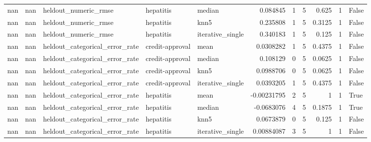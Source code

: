 \begin{table}[ht]
\begin{tabular}{rrlllrrrrrl}
        nan &     nan & heldout\_numeric\_rmse           & hepatitis       & median           &      0.084845    &                   1 &       5 &    0.625  &        1 & False              \\
        nan &     nan & heldout\_numeric\_rmse           & hepatitis       & knn5             &      0.235808    &                   1 &       5 &    0.3125 &        1 & False              \\
        nan &     nan & heldout\_numeric\_rmse           & hepatitis       & iterative\_single &      0.340183    &                   1 &       5 &    0.125  &        1 & False              \\
        nan &     nan & heldout\_categorical\_error\_rate & credit-approval & mean             &      0.0308282   &                   1 &       5 &    0.4375 &        1 & False              \\
        nan &     nan & heldout\_categorical\_error\_rate & credit-approval & median           &      0.108129    &                   0 &       5 &    0.0625 &        1 & False              \\
        nan &     nan & heldout\_categorical\_error\_rate & credit-approval & knn5             &      0.0988706   &                   0 &       5 &    0.0625 &        1 & False              \\
        nan &     nan & heldout\_categorical\_error\_rate & credit-approval & iterative\_single &      0.0393205   &                   1 &       5 &    0.4375 &        1 & False              \\
        nan &     nan & heldout\_categorical\_error\_rate & hepatitis       & mean             &     -0.00231795  &                   2 &       5 &    1      &        1 & True               \\
        nan &     nan & heldout\_categorical\_error\_rate & hepatitis       & median           &     -0.0683076   &                   4 &       5 &    0.1875 &        1 & True               \\
        nan &     nan & heldout\_categorical\_error\_rate & hepatitis       & knn5             &      0.0673879   &                   0 &       5 &    0.125  &        1 & False              \\
        nan &     nan & heldout\_categorical\_error\_rate & hepatitis       & iterative\_single &      0.00884087  &                   3 &       5 &    1      &        1 & False              \\
\hline
\end{tabular}
\end{table}
